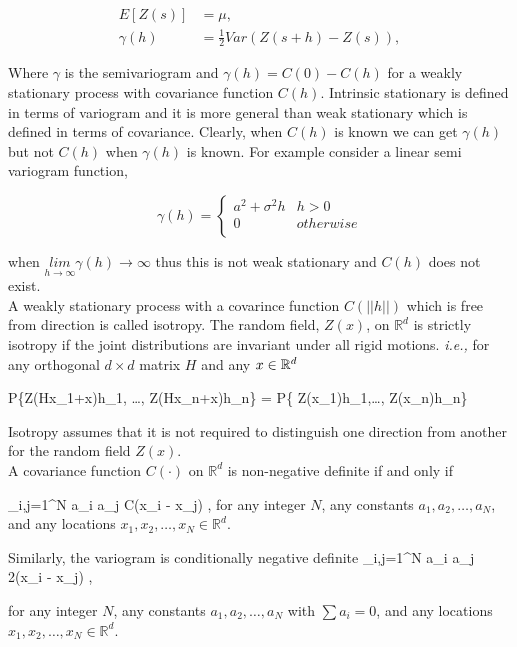 \begin{align}
	E[Z(s)]   & = \mu , \nonumber                \\
	\gamma(h) & = \frac{1}{2} Var(Z(s+h) -Z(s)), 
\end{align}

Where $\gamma$ is the semivariogram and $\gamma(h) = C(0) - C(h)$ for a weakly stationary process with covariance function $C(h)$. Intrinsic stationary is defined in terms of variogram and it is more general than weak stationary which is defined in terms of covariance. Clearly, when $C(h)$ is known we can get $\gamma(h)$ but not $C(h)$ when $\gamma(h)$ is known. For example consider a linear semi variogram function,

\[
	\gamma(h) = \left \{ \begin{array}{cc}
	a^2+\sigma^2h & h>0 \\
	0 & otherwise \\
	\end{array}
	\right.
\]

when $\underset{h \to \infty} {lim} \gamma(h) \to \infty$ thus this is not weak stationary and $C(h)$ does not exist. \\


A weakly stationary process with a covarince function $C(||h||)$ which is free from direction is called isotropy. The random field, $Z(x)$, on $\mathbb{R}^d$ is strictly isotropy if the joint distributions are invariant under all rigid motions. {\em i.e.,} for any orthogonal $d\times d$ matrix $H$ and any $x\in \mathbb{R}^d$

\beq
P\{Z(Hx_1+x)\le h_1, \ldots, Z(Hx_n+x)\le h_n\} = P\{ Z(x_1)\le h_1,\ldots, Z(x_n)\le h_n\}
\eeq

Isotropy assumes that it is not required to distinguish one direction from another for the random field $Z(x)$.\\


A covariance function $C(\cdot)$ on $\mathbb{R}^d$ is non-negative definite  if and only if 

\beq \label{cov_pd}
\sum_{i,j=1}^{N} a_i a_j C(x_i - x_j) ,
\eeq
for any integer $N$, any constants $a_1, a_2, \ldots, a_N$, and any locations $x_1, x_2, \ldots, x_N \in \mathbb{R}^d$.

Similarly, the variogram is conditionally negative definite
\beq
\sum_{i,j=1}^{N} a_i a_j 2\gamma(x_i - x_j) ,
\eeq

for any integer $N$, any constants $a_1, a_2, \ldots, a_N$ with $\sum a_i = 0$, and any locations $x_1, x_2, \ldots, x_N \in \mathbb{R}^d$.


